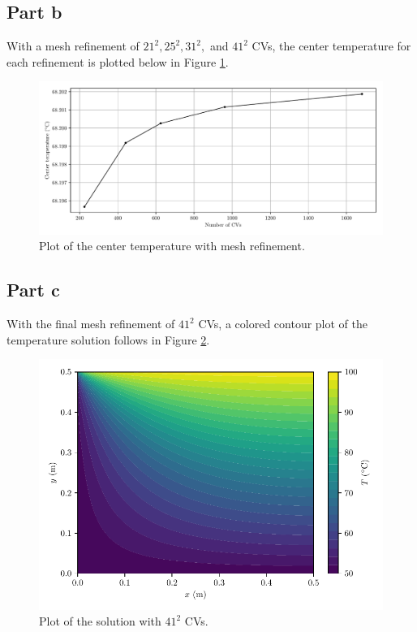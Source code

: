 \documentclass{article}
\begin{document}
\subsection*{Part b}

With a mesh refinement of $21^2, 25^2, 31^2,$ and $41^2$ CVs, the center temperature for each refinement is plotted below in Figure \ref{fig:center}.

\begin{figure}[H]
	\centering
	\includegraphics[width=\linewidth]{../python/center}
	\caption{Plot of the center temperature with mesh refinement.}
	\label{fig:center}
\end{figure}

\subsection*{Part c}

With the final mesh refinement of $41^2$ CVs, a colored contour plot of the temperature solution follows in Figure \ref{fig:solution}.

\begin{figure}[H]
	\centering
	\includegraphics[width=0.7\linewidth]{../python/solution}
	\caption{Plot of the solution with $41^2$ CVs.}
	\label{fig:solution}
\end{figure}
\end{document}
